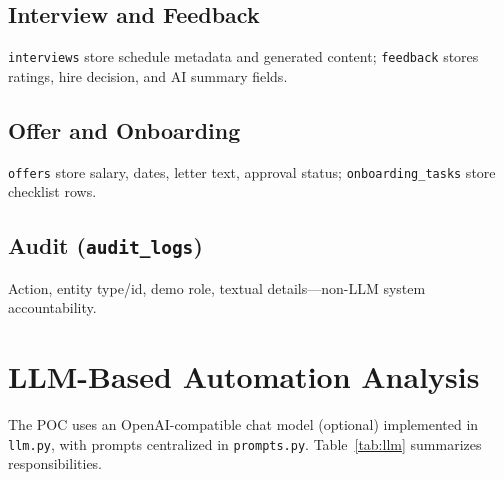 \documentclass[12pt]{article}
\begin{document}
\subsection{Interview and Feedback}

\texttt{interviews} store schedule metadata and generated content; \texttt{feedback} stores ratings, hire decision, and AI summary fields.

\subsection{Offer and Onboarding}

\texttt{offers} store salary, dates, letter text, approval status; \texttt{onboarding\_tasks} store checklist rows.

\subsection{Audit (\texttt{audit\_logs})}

Action, entity type/id, demo role, textual details---non-LLM system accountability.

\section{LLM-Based Automation Analysis}
\label{sec:llm}

The POC uses an OpenAI-compatible chat model (optional) implemented in \texttt{llm.py}, with prompts centralized in \texttt{prompts.py}. Table~\ref{tab:llm} summarizes responsibilities.
\end{document}
